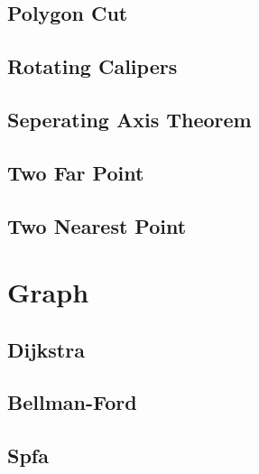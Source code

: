 \documentclass[10pt,landscape,a4paper,twocolumn]{article}
\begin{document}
\subsection{Polygon Cut}


\subsection{Rotating Calipers}


\subsection{Seperating Axis Theorem}



% 

\subsection{Two Far Point}


\subsection{Two Nearest Point}



\section{Graph}

\subsection{Dijkstra}


\subsection{Bellman-Ford}


\subsection{Spfa}

\end{document}
